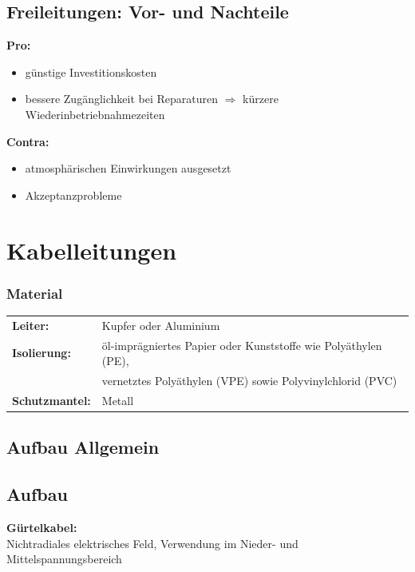\subsection{Freileitungen: Vor- und Nachteile}

\textbf{Pro:}
\begin{itemize}
    \item günstige Investitionskosten
    \item bessere Zugänglichkeit bei Reparaturen $\Rightarrow$ kürzere Wiederinbetriebnahmezeiten
\end{itemize}
\vspace{1em}
\textbf{Contra:}
\begin{itemize}
    \item atmosphärischen Einwirkungen ausgesetzt
    \item Akzeptanzprobleme
\end{itemize}


\section{Kabelleitungen}

\subsubsection{Material}

\begin{tabular}{>{\bfseries}l l}
    Leiter: & Kupfer oder Aluminium \\
    Isolierung: & öl-imprägniertes Papier oder Kunststoffe wie Polyäthylen (PE), \\
                & vernetztes Polyäthylen (VPE) sowie Polyvinylchlorid (PVC) \\
    Schutzmantel: & Metall \\
\end{tabular}


\subsection{Aufbau Allgemein}


\subsection{Aufbau}

\textbf{Gürtelkabel:}\\
Nichtradiales elektrisches Feld, Verwendung im Nieder- und Mittelspannungsbereich

